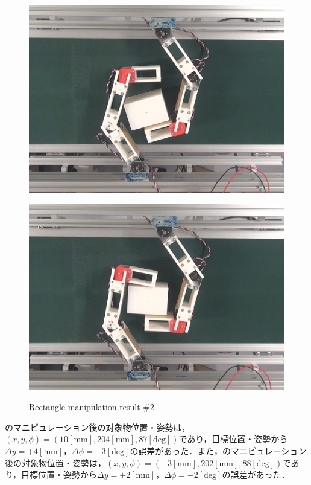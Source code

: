 \documentclass[a4paper,twoside,12pt,papersize, dvipdfmx]{iirthesis}
\begin{document}
\begin{figure}[hbt]
\begin{minipage}{0.249\hsize}
\includegraphics[width=0.98\hsize]{fig/4-manipulation-result/Rectangle/2-3.jpg}
\subcaption{}\label{}
\end{minipage}\hfill
\begin{minipage}{0.249\hsize}
\centering
\includegraphics[width=0.98\hsize]{fig/4-manipulation-result/Rectangle/2-4.jpg}
\subcaption{}\label{}
\end{minipage}
\caption{Rectangle manipulation result \#2}\label{fig::result::rm2}
\end{figure}

のマニピュレーション後の対象物位置・姿勢は，$(x, y, \phi) = (10 \mathrm{[mm]}, 204 \mathrm{[mm]}, 87 \mathrm{[deg]})$であり，目標位置・姿勢から$\Delta y = +4 \mathrm{[mm]}$，$\Delta \phi = -3 \mathrm{[deg]}$の誤差があった．また，のマニピュレーション後の対象物位置・姿勢は，$(x, y, \phi) = (-3 \mathrm{[mm]}, 202 \mathrm{[mm]}, 88 \mathrm{[deg]})$であり，目標位置・姿勢から$\Delta y = +2 \mathrm{[mm]}$，$\Delta \phi = -2 \mathrm{[deg]}$の誤差があった．\par
\end{document}

